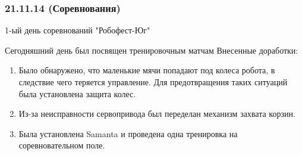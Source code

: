 \subsubsection{21.11.14 (Соревнования)}

\begin{center}
	1-ый день соревнований "Робофест-Юг"
\end{center}
Сегодняшний день был посвящен тренировочным матчам
\newline
Внесенные доработки:
\begin{enumerate}
	\item Было обнаружено, что  маленькие мячи попадают под колеса робота, в следствие чего теряется управление. Для предотвращения таких ситуаций была установлена защита колес.
	\item Из-за неисправности сервопривода был переделан механизм захвата корзин.
	\item Была установлена Samanta и проведена одна тренировка на соревновательном поле.
\end{enumerate}
\fillpage